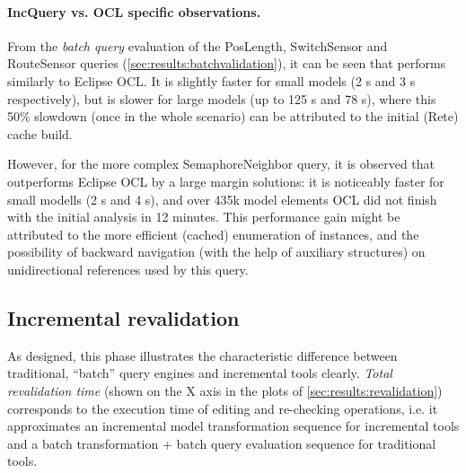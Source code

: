 \paragraph{IncQuery vs. OCL specific observations.}

 
From the \emph{batch query} evaluation of the \textsf{PosLength},
\textsf{SwitchSensor} and \textsf{RouteSensor} queries
(\autoref{sec:results:batchvalidation}), it can be seen that \eiq{} performs
similarly to Eclipse OCL. It is slightly faster for small models (2 s and 3 s
respectively), but is slower for large models (up to 125 s and 78 s), where this
50\% slowdown (once in the whole scenario) can be attributed to the initial
(Rete) cache build.


However, for the more complex \textsf{SemaphoreNeighbor} query, it is observed that
\eiq{} outperforms Eclipse OCL by a large margin solutions: it is noticeably
faster for small modells (2 s and 4 s), and over 435k model elements OCL did not
finish with the initial analysis in 12 minutes. This performance gain might be
attributed to the more efficient (cached) enumeration of instances, and the
possibility of backward navigation (with the help of auxiliary structures) on
unidirectional references used by this query.



\subsection{Incremental revalidation}
As designed, this phase illustrates the characteristic difference between traditional, ``batch'' query engines and incremental tools clearly. \emph{Total revalidation time} (shown on the X axis in the plots of \autoref{sec:results:revalidation}) corresponds to the execution time of editing and re-checking operations, i.e. it approximates an incremental model transformation sequence for incremental tools and a batch transformation + batch query evaluation sequence for traditional tools.

